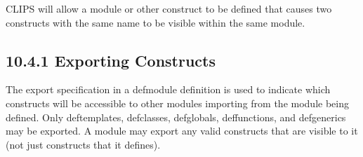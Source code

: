 \documentclass[letterpaper,10pt,english]{sphinxmanual}
\begin{document}
\begin{sphinxVerbatim}[commandchars=\\\{\}]
 
  
    
  
      
\PYG{p}{[}\PYG{p}{]}       
 
 
 
     
    
      
      
\end{sphinxVerbatim}

CLIPS will  allow a module or other construct to be defined that
causes two constructs with the same name to be visible within the same
module.


\subsection{10.4.1 Exporting Constructs}
\label{\detokenize{defmodule:exporting-constructs}}
The export specification in a defmodule definition is used to indicate
which constructs will be accessible to other modules importing from the
module being defined. Only deftemplates, defclasses, defglobals,
deffunctions, and defgenerics may be exported. A module may export any
valid constructs that are visible to it (not just constructs that it
defines).
\end{document}
